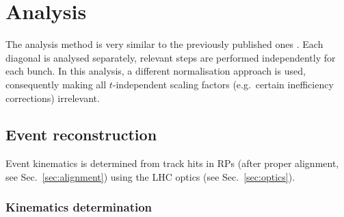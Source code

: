 \section{Analysis}

The analysis method is very similar to the previously published ones \cite{prl111,epl101-el}. Each diagonal is analysed
separately, relevant steps are performed independently for each bunch. In this analysis, a different normalisation
approach is used, consequently making all $t$-independent scaling factors (e.g.~certain inefficiency corrections)
irrelevant.




\subsection{Event reconstruction}

Event kinematics is determined from track hits in RPs (after proper alignment, see Sec.~\ref{sec:alignment}) using the LHC optics (see Sec.~\ref{sec:optics}).


\subsubsection{Kinematics determination}
\label{sec:kinematics}

